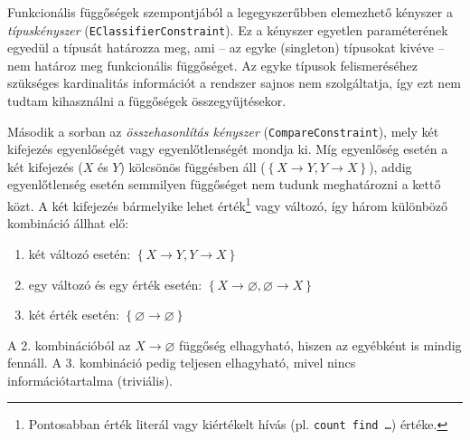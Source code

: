 Funkcionális függőségek szempontjából a legegyszerűbben elemezhető kényszer a \emph{típuskényszer} (\texttt{EClassifierConstraint}).
Ez a kényszer egyetlen paraméterének egyedül a típusát határozza meg, ami -- az egyke (singleton) típusokat kivéve -- nem határoz meg funkcionális függőséget.
Az egyke típusok felismeréséhez szükséges kardinalitás információt a rendszer sajnos nem szolgáltatja, így ezt nem tudtam kihasználni a függőségek összegyűjtésekor.

Második a sorban az \emph{összehasonlítás kényszer} (\texttt{CompareConstraint}), mely két kifejezés egyenlőségét vagy egyenlőtlenségét mondja ki.
Míg egyenlőség esetén a két kifejezés ($X$ és $Y$) kölcsönös függésben áll ($\left\{ X \rightarrow Y , Y \rightarrow X \right\}$), addig egyenlőtlenség esetén semmilyen függőséget nem tudunk meghatározni a kettő közt.
A két kifejezés bármelyike lehet érték\footnote{Pontosabban érték literál vagy kiértékelt hívás (pl. \texttt{count find \ldots}) értéke.} vagy változó, így három különböző kombináció állhat elő:
\begin{enumerate}
    \item két változó esetén: $\left\{ X \rightarrow Y, Y \rightarrow X \right\}$
    \item egy változó és egy érték esetén: $\left\{ X \rightarrow \varnothing, \varnothing \rightarrow X \right\}$
    \item két érték esetén: $\left\{ \varnothing \rightarrow \varnothing \right\}$
\end{enumerate}
A 2. kombinációból az $X \rightarrow \varnothing$ függőség elhagyható, hiszen az egyébként is mindig fennáll.
A 3. kombináció pedig teljesen elhagyható, mivel nincs információtartalma (triviális).

